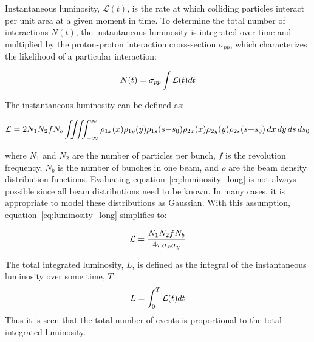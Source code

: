 Instantaneous luminosity, $\mathcal{L} (t)$, is the rate at which colliding particles interact per unit area at a given moment in time. To determine the total number of interactions $N(t)$, the instantaneous luminosity is integrated over time and multiplied by the proton-proton interaction cross-section $\sigma_{pp}$, which characterizes the likelihood of a particular interaction:

\begin{equation}
    \centering
    N(t) = \sigma_{pp} \int \mathcal{L} (t) dt
\end{equation}

\noindent{}The instantaneous luminosity can be defined as:

\begin{equation}
    \centering
    \mathcal{L} = 2 N_1 N_2 f N_b \int \!\!\! \int \!\!\! \int \!\!\! \int_{-\infty}^{\infty} \rho_{1x}(x)\rho_{1y}(y)\rho_{1s}(s{-}s_0)\rho_{2x}(x)\rho_{2y}(y)\rho_{2s}(s{+}s_0)\, dx\, dy\, ds\, ds_0
\end{equation}\label{eq:luminosity_long}

\noindent{}where $N_1$ and $N_2$ are the number of particles per bunch, $f$ is the revolution frequency, $N_b$ is the number of bunches in one beam, and $\rho$ are the beam density distribution functions. Evaluating equation~\ref{eq:luminosity_long} is not always possible since all beam distributions need to be known. In many cases, it is appropriate to model these distributions as Gaussian.
With this assumption, equation~\ref{eq:luminosity_long} simplifies to:

\begin{equation}
    \centering
    \mathcal{L} = \frac{N_1 N_2 f N_b}{4\pi \sigma_x \sigma_y}
\end{equation}

\noindent{}The total integrated luminosity, $L$, is defined as the integral of the instantaneous luminosity over some time, $T$:
\begin{equation}
    \centering
    L = \int_{0}^{T} \mathcal{L} (t) dt
\end{equation}
\noindent{}Thus it is seen that the total number of events is proportional to the total integrated luminosity.

